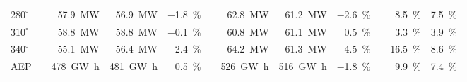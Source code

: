 \documentclass[conf]{new-aiaa}
\begin{document}
\begin{table}[htpb!]
\begin{tabular}{@{}lcrrrcrrrcrr@{}}
\multicolumn{1}{l}{$280^{\circ}$} & & \SI[per-mode=symbol]{57.9}{\mega\watt} &\SI[per-mode=symbol]{56.9}{\mega\watt} &\SI[per-mode=symbol]{-1.8}{\percent} & &\SI[per-mode=symbol]{62.8}{\mega\watt} &\SI[per-mode=symbol]{61.2}{\mega\watt} &\SI[per-mode=symbol]{-2.6}{\percent} & &\SI[per-mode=symbol]{8.5}{\percent} &\SI[per-mode=symbol]{7.5}{\percent} \\


\multicolumn{1}{l}{$310^{\circ}$} & & \SI[per-mode=symbol]{58.8}{\mega\watt} &\SI[per-mode=symbol]{58.8}{\mega\watt} &\SI[per-mode=symbol]{-0.1}{\percent} & &\SI[per-mode=symbol]{60.8}{\mega\watt} &\SI[per-mode=symbol]{61.1}{\mega\watt} &\SI[per-mode=symbol]{.5}{\percent} & &\SI[per-mode=symbol]{3.3}{\percent} &\SI[per-mode=symbol]{3.9}{\percent} \\

\multicolumn{1}{l}{$340^{\circ}$} & & \SI[per-mode=symbol]{55.1}{\mega\watt} &\SI[per-mode=symbol]{56.4}{\mega\watt} &\SI[per-mode=symbol]{2.4}{\percent} & &\SI[per-mode=symbol]{64.2}{\mega\watt} &\SI[per-mode=symbol]{61.3}{\mega\watt} &\SI[per-mode=symbol]{-4.5}{\percent} & &\SI[per-mode=symbol]{16.5}{\percent} &\SI[per-mode=symbol]{8.6}{\percent} \\

\hline
\multicolumn{1}{l}{AEP}& &\SI[per-mode=symbol]{478}{\giga\watt\hour} &\SI[per-mode=symbol]{481}{\giga\watt\hour} &\SI[per-mode=symbol]{0.5}{\percent} & &\SI[per-mode=symbol]{526}{\giga\watt\hour} &\SI[per-mode=symbol]{516}{\giga\watt\hour} &\SI[per-mode=symbol]{-1.8}{\percent} & &\SI[per-mode=symbol]{9.9}{\percent} &\SI[per-mode=symbol]{7.4}{\percent}\\ 
 \bottomrule
\end{tabular}

\end{table}
%
\end{document}
